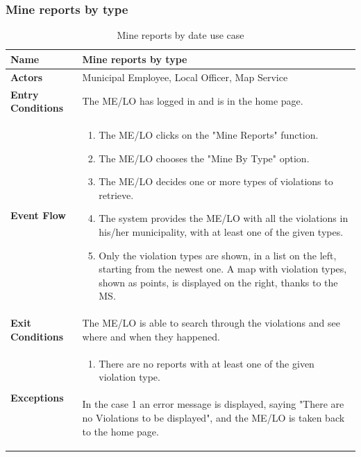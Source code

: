 					\subsubsection{Mine reports by type}
					\begin{table}[!h]
						\centering
						\vspace{-2mm}
						\begin{tabular}{lp{}}
							\toprule
							\textbf{Name} & \textbf{Mine reports by type} \\[1mm]
							\midrule
							\textbf{Actors} & Municipal Employee, Local Officer, Map Service \\[1mm]
							\textbf{Entry Conditions} & The ME/LO has logged in and is in the home page. \vspace{1mm}\\
							\textbf{Event Flow} &
							\vspace{-5mm} 
							\begin{enumerate}
								\setlength\itemsep{0.2mm}
								\item The ME/LO clicks on the "Mine Reports" function.
								\item The ME/LO chooses the "Mine By Type" option.
								\item The ME/LO decides one or more types of violations to retrieve.
								\item The system provides the ME/LO with all the violations in his/her municipality, with at least one of the given types.
								\item Only the violation types are shown, in a list on the left, starting from the newest one. A map with violation types, shown as points, is displayed on the right, thanks to the MS.
							\end{enumerate} \\
							\textbf{Exit Conditions} & The ME/LO is able to search through the violations and see where and when they happened. \vspace{1mm}\\
							\textbf{Exceptions} & 
								\vspace{-5mm} 
								\begin{enumerate}
									\item There are no reports with at least one of the given violation type.
								\end{enumerate}
								\vspace{-7mm}
								\paragraph{}
									In the case 1 an error message is displayed, saying "There are no Violations to be displayed", and the ME/LO is taken back to the home page. \\
							\bottomrule
						\end{tabular}
						\caption{Mine reports by date use case}
					\end{table}
					\clearpage
